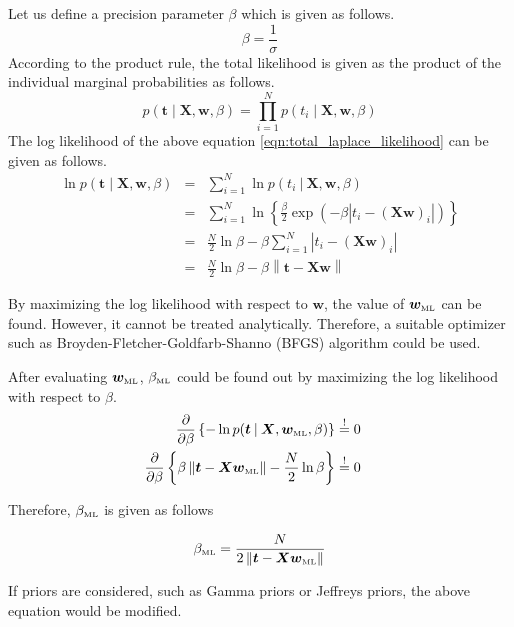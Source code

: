 \documentclass[11pt]{article}
\newcommand{\mle}[1]{{#1}_{\text{\tiny ML}}}
\newcommand\given[1][]{\:#1\vert\:}
\newcommand{\norm}[1]{\left\lVert#1\right\rVert}
\begin{document}
Let us define a precision parameter $\beta$ which is given as follows.
\begin{equation}
    \beta = \frac{1}{\sigma}
\end{equation}
According to the product rule, the total likelihood is given as the product of the individual marginal probabilities as follows.
\begin{equation}\label{eqn:total_laplace_likelihood}
    p(\bm{t} \mid \bm{X}, \bm{w}, \beta) = \prod_{i=1}^Np(t_i \mid \bm{X}, \bm{w}, \beta)
\end{equation}
The log likelihood of the above equation \ref{eqn:total_laplace_likelihood} can be given as follows.
\begin{eqnarray}
    \ln{p(\bm{t} \mid \bm{X}, \bm{w}, \beta)} 
    &=& 
    \sum_{i=1}^N \ln p(t_i \given \bm{X}, \bm{w}, \beta) \\
    &=&
    \sum_{i=1}^N \ln{\left\{\frac{\beta}{2}\exp{\left(-\beta \left\lvert t_i - (\bm{X w})_i \right\lvert \right)}\right\}} \\
    &=&
    \frac{N}{2}\ln{\beta} - \beta \sum_{i=1}^N \left\lvert t_i - (\bm{X w})_i \right\lvert \\
    &=&
    \frac{N}{2}\ln{\beta} - \beta \norm{\bm{t} - \bm{X w}}
\end{eqnarray}

By maximizing the log likelihood with respect to $\bm{w}$, the value of $\mle{\bm{w}}$ can be found. However, it cannot be treated analytically. Therefore, a suitable optimizer such as Broyden-Fletcher-Goldfarb-Shanno (BFGS) algorithm could be used. 

After evaluating $\mle{\bm{w}}$, $\mle{\beta}$ could be found out by maximizing the log likelihood with respect to $\beta$. 
\begin{eqnarray}
    \frac{\partial }{\partial  \beta} \left\{ -\ln{p(\bm{t} \given \bm{X}, \mle{\bm{w}}, \beta)} \right\} 
    &\overset{!}{=} 0& \\
    \frac{\partial }{\partial  \beta} \left\{\beta \norm{\bm{t} - \bm{X\mle{\bm{w}}}} - \frac{N}{2}\ln{\beta} \right\}
    &\overset{!}{=} 0&
\end{eqnarray}

Therefore, $\mle{\beta}$ is given as follows

\begin{equation}
    \mle{\beta} = \frac{N}{2\norm{\bm{t} - \bm{X\mle{\bm{w}}}}}
\end{equation}

If priors are considered, such as Gamma priors or Jeffreys priors, the above equation would be modified.
\end{document}
